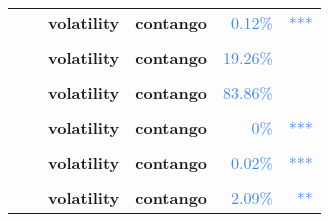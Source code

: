 \documentclass[
  authoryear,
  preprint,
  3p]{elsarticle}
\begin{document}
\begin{longtable}[t]{>{}l>{}l>{}l>{}l>{}r>{}r}
\addlinespace
\textbf{} & \textbf{} & \textbf{volatility} & \textbf{contango} & \textcolor[HTML]{4285f4}{0.12\%} & \textcolor[HTML]{4285f4}{***}\\
\textbf{\cellcolor{gray!10}{Platinum (XNYM)}} & \textbf{\cellcolor{gray!10}{past}} & \textbf{\cellcolor{gray!10}{mean}} & \textbf{\cellcolor{gray!10}{backwardation}} & \textcolor[HTML]{4285f4}{\cellcolor{gray!10}{6.08\%}} & \textcolor[HTML]{4285f4}{\cellcolor{gray!10}{*}}\\
\textbf{} & \textbf{} & \textbf{volatility} & \textbf{contango} & \textcolor[HTML]{4285f4}{19.26\%} & \textcolor[HTML]{4285f4}{}\\
\textbf{\cellcolor{gray!10}{}} & \textbf{\cellcolor{gray!10}{financialisation}} & \textbf{\cellcolor{gray!10}{mean}} & \textbf{\cellcolor{gray!10}{backwardation}} & \textcolor[HTML]{4285f4}{\cellcolor{gray!10}{14.41\%}} & \textcolor[HTML]{4285f4}{\cellcolor{gray!10}{}}\\
\textbf{} & \textbf{} & \textbf{volatility} & \textbf{contango} & \textcolor[HTML]{4285f4}{83.86\%} & \textcolor[HTML]{4285f4}{}\\
\addlinespace
\textbf{\cellcolor{gray!10}{}} & \textbf{\cellcolor{gray!10}{crisis}} & \textbf{\cellcolor{gray!10}{mean}} & \textbf{\cellcolor{gray!10}{backwardation}} & \textcolor[HTML]{4285f4}{\cellcolor{gray!10}{85.5\%}} & \textcolor[HTML]{4285f4}{\cellcolor{gray!10}{}}\\
\textbf{} & \textbf{} & \textbf{volatility} & \textbf{contango} & \textcolor[HTML]{4285f4}{0\%} & \textcolor[HTML]{4285f4}{\vphantom{11} ***}\\
\textbf{\cellcolor{gray!10}{}} & \textbf{\cellcolor{gray!10}{post-crisis}} & \textbf{\cellcolor{gray!10}{mean}} & \textbf{\cellcolor{gray!10}{backwardation}} & \textcolor[HTML]{4285f4}{\cellcolor{gray!10}{27.26\%}} & \textcolor[HTML]{4285f4}{\cellcolor{gray!10}{}}\\
\textbf{} & \textbf{} & \textbf{volatility} & \textbf{contango} & \textcolor[HTML]{4285f4}{0.02\%} & \textcolor[HTML]{4285f4}{***}\\
\textbf{\cellcolor{gray!10}{Silver (XCEC)}} & \textbf{\cellcolor{gray!10}{past}} & \textbf{\cellcolor{gray!10}{mean}} & \textbf{\cellcolor{gray!10}{contango}} & \textcolor[HTML]{4285f4}{\cellcolor{gray!10}{96.07\%}} & \textcolor[HTML]{4285f4}{\cellcolor{gray!10}{}}\\
\addlinespace
\textbf{} & \textbf{} & \textbf{volatility} & \textbf{contango} & \textcolor[HTML]{4285f4}{2.09\%} & \textcolor[HTML]{4285f4}{**}\\

\end{longtable}
\end{document}
